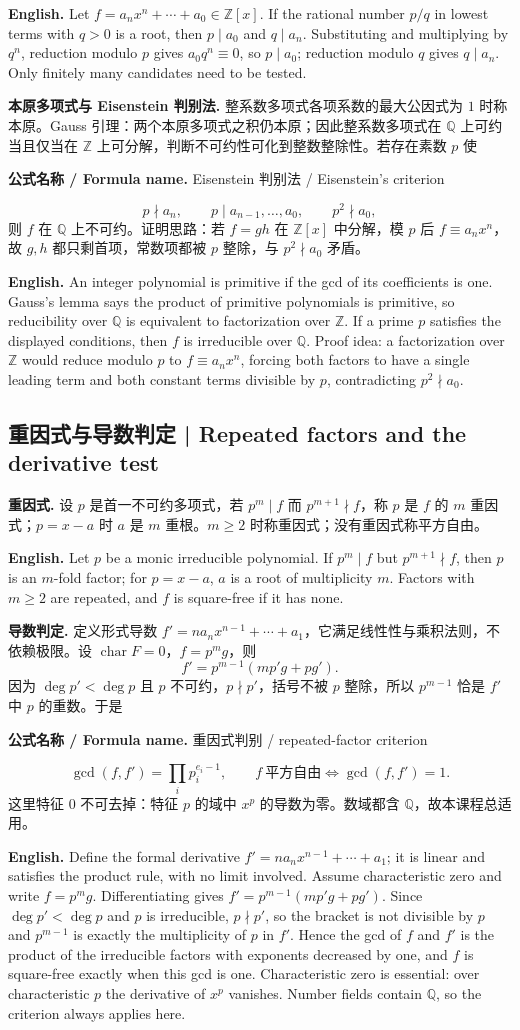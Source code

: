 \documentclass[UTF8,11pt,a4paper]{ctexart}
\newcommand{\EN}[1]{\par\noindent\textbf{English.} #1\par}
\newcommand{\FORMULA}[2]{\par\noindent\textbf{公式名称 / Formula name.} #1 / #2\par}
\begin{document}
\EN{Let $f=a_nx^n+\cdots+a_0\in\mathbb Z[x]$. If the rational number $p/q$ in lowest terms with $q>0$ is a root, then $p\mid a_0$ and $q\mid a_n$. Substituting and multiplying by $q^n$, reduction modulo $p$ gives $a_0q^n\equiv0$, so $p\mid a_0$; reduction modulo $q$ gives $q\mid a_n$. Only finitely many candidates need to be tested.}
\noindent\textbf{本原多项式与 Eisenstein 判别法.} 整系数多项式各项系数的最大公因式为 $1$ 时称本原。Gauss 引理：两个本原多项式之积仍本原；因此整系数多项式在 $\mathbb Q$ 上可约当且仅当在 $\mathbb Z$ 上可分解，判断不可约性可化到整数整除性。若存在素数 $p$ 使
\FORMULA{Eisenstein 判别法}{Eisenstein's criterion}
\[
p\nmid a_n,\qquad p\mid a_{n-1},\dots,a_0,\qquad p^2\nmid a_0,
\]
则 $f$ 在 $\mathbb Q$ 上不可约。证明思路：若 $f=gh$ 在 $\mathbb Z[x]$ 中分解，模 $p$ 后 $f\equiv a_nx^n$，故 $g,h$ 都只剩首项，常数项都被 $p$ 整除，与 $p^2\nmid a_0$ 矛盾。
\EN{An integer polynomial is primitive if the gcd of its coefficients is one. Gauss's lemma says the product of primitive polynomials is primitive, so reducibility over $\mathbb Q$ is equivalent to factorization over $\mathbb Z$. If a prime $p$ satisfies the displayed conditions, then $f$ is irreducible over $\mathbb Q$. Proof idea: a factorization over $\mathbb Z$ would reduce modulo $p$ to $f\equiv a_nx^n$, forcing both factors to have a single leading term and both constant terms divisible by $p$, contradicting $p^2\nmid a_0$.}

\subsection{重因式与导数判定 | Repeated factors and the derivative test}
\noindent\textbf{重因式.} 设 $p$ 是首一不可约多项式，若 $p^m\mid f$ 而 $p^{m+1}\nmid f$，称 $p$ 是 $f$ 的 $m$ 重因式；$p=x-a$ 时 $a$ 是 $m$ 重根。$m\ge2$ 时称重因式；没有重因式称平方自由。
\EN{Let $p$ be a monic irreducible polynomial. If $p^m\mid f$ but $p^{m+1}\nmid f$, then $p$ is an $m$-fold factor; for $p=x-a$, $a$ is a root of multiplicity $m$. Factors with $m\ge2$ are repeated, and $f$ is square-free if it has none.}
\noindent\textbf{导数判定.} 定义形式导数 $f'=na_nx^{n-1}+\cdots+a_1$，它满足线性性与乘积法则，不依赖极限。设 $\operatorname{char}F=0$，$f=p^mg$，则
\[
f'=p^{m-1}(mp'g+pg').
\]
因为 $\deg p'<\deg p$ 且 $p$ 不可约，$p\nmid p'$，括号不被 $p$ 整除，所以 $p^{m-1}$ 恰是 $f'$ 中 $p$ 的重数。于是
\FORMULA{重因式判别}{repeated-factor criterion}
\[
\gcd(f,f')=\prod_i p_i^{e_i-1},\qquad
f\ \text{平方自由}\iff \gcd(f,f')=1.
\]
这里特征 $0$ 不可去掉：特征 $p$ 的域中 $x^p$ 的导数为零。数域都含 $\mathbb Q$，故本课程总适用。
\EN{Define the formal derivative $f'=na_nx^{n-1}+\cdots+a_1$; it is linear and satisfies the product rule, with no limit involved. Assume characteristic zero and write $f=p^mg$. Differentiating gives $f'=p^{m-1}(mp'g+pg')$. Since $\deg p'<\deg p$ and $p$ is irreducible, $p\nmid p'$, so the bracket is not divisible by $p$ and $p^{m-1}$ is exactly the multiplicity of $p$ in $f'$. Hence the gcd of $f$ and $f'$ is the product of the irreducible factors with exponents decreased by one, and $f$ is square-free exactly when this gcd is one. Characteristic zero is essential: over characteristic $p$ the derivative of $x^p$ vanishes. Number fields contain $\mathbb Q$, so the criterion always applies here.}
\end{document}
